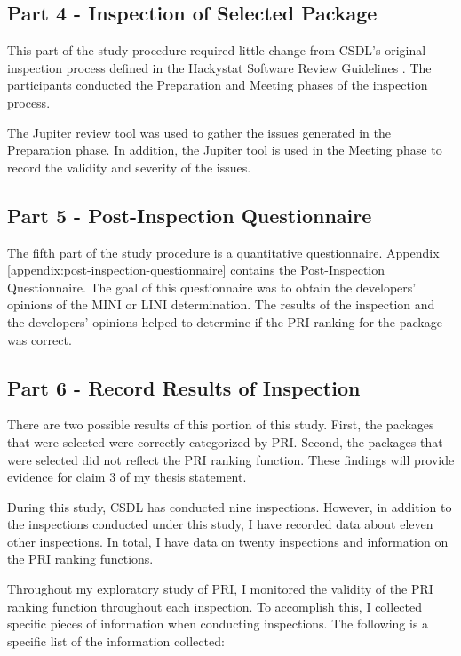 \subsection{Part 4 - Inspection of Selected Package}
This part of the study procedure required little change from CSDL's
original inspection process defined in the Hackystat Software Review
Guidelines \cite{SoftwareReviewGuidelines}. The participants conducted
the Preparation and Meeting phases of the inspection process.

The Jupiter review tool \cite{Jupiter} was used to gather the issues
generated in the Preparation phase. In addition, the Jupiter tool is used
in the Meeting phase to record the validity and severity of the issues.


\subsection{Part 5 - Post-Inspection Questionnaire}
The fifth part of the study procedure is a quantitative questionnaire.
Appendix \ref{appendix:post-inspection-questionnaire} contains the
Post-Inspection Questionnaire. The goal of this questionnaire was to obtain
the developers' opinions of the MINI or LINI determination. The results of
the inspection and the developers' opinions helped to determine if the PRI
ranking for the package was correct.


\subsection{Part 6 - Record Results of Inspection}
There are two possible results of this portion of this study. First, the
packages that were selected were correctly categorized by PRI. Second, the
packages that were selected did not reflect the PRI ranking function. These
findings will provide evidence for claim 3 of my thesis statement.

During this study, CSDL has conducted nine inspections. However, in
addition to the inspections conducted under this study, I have recorded
data about eleven other inspections. In total, I have data on twenty
inspections and information on the PRI ranking functions.

Throughout my exploratory study of PRI, I monitored the validity of the PRI
ranking function throughout each inspection. To accomplish this, I
collected specific pieces of information when conducting inspections. The
following is a specific list of the information collected:

